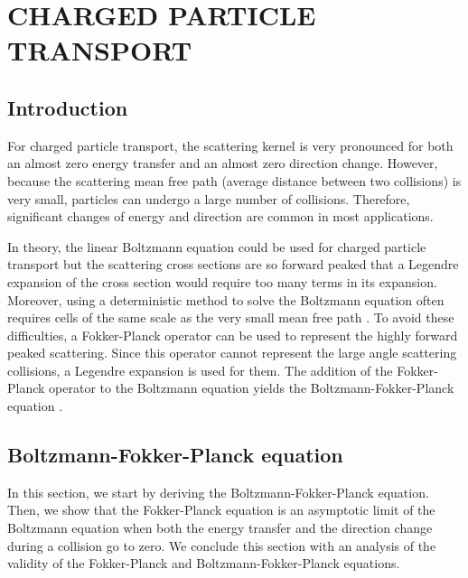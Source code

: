 \chapter{\uppercase{Charged particle transport}} \label{cp_transport}
\section{Introduction}
For charged particle transport, the scattering kernel is very pronounced 
for both an almost zero energy transfer and an almost zero direction 
change. However, because the
scattering mean free path (average distance between two collisions) is very
small, particles can undergo a large number of collisions. Therefore,
significant changes of energy and direction are common in most applications.

In theory, the linear Boltzmann equation could be used for charged particle
transport but the scattering cross sections are so forward peaked that a Legendre 
expansion of the cross section would require too many terms in its expansion. 
Moreover, using a deterministic method to solve the Boltzmann equation often 
requires cells of the same scale as the very small mean free path \cite{pomraning}. 
To avoid these difficulties, a Fokker-Planck operator can
be used to represent the highly forward peaked scattering. Since this operator 
cannot represent the large angle scattering collisions, a Legendre expansion 
is used for them. The addition of the Fokker-Planck operator to the 
Boltzmann equation yields the Boltzmann-Fokker-Planck equation \cite{ligou}.

\section{Boltzmann-Fokker-Planck equation}
In this section, we start by deriving the Boltzmann-Fokker-Planck equation.
Then, we show that the Fokker-Planck equation is an asymptotic limit of the Boltzmann
equation when both the energy transfer and the direction change during a collision go 
to zero. We conclude this section with an analysis of the validity of the 
Fokker-Planck and Boltzmann-Fokker-Planck equations.
